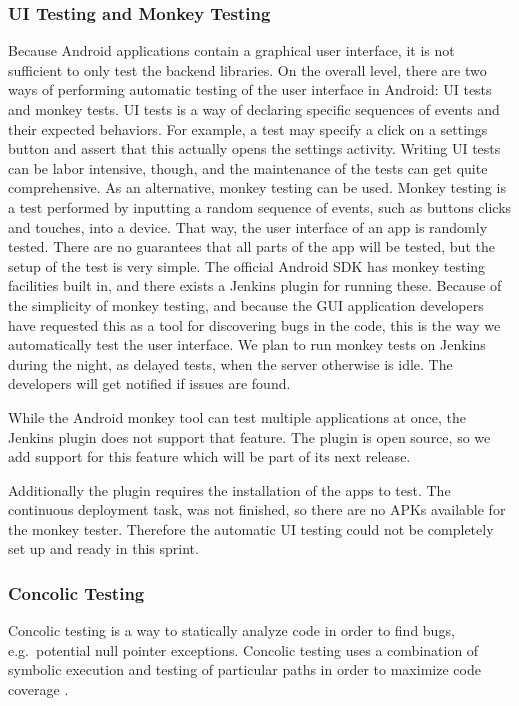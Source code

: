 \subsubsection{UI Testing and Monkey Testing}
Because Android applications contain a graphical user interface, it is not sufficient to only test the backend libraries. On the overall level, there are two ways of performing automatic testing of the user interface in Android: UI tests and monkey tests. UI tests is a way of declaring specific sequences of events and their expected behaviors. For example, a test may specify a click on a settings button and assert that this actually opens the settings activity. Writing UI tests can be labor intensive, though, and the maintenance of the tests can get quite comprehensive. As an alternative, monkey testing can be used. Monkey testing is a test performed by inputting a random sequence of events, such as buttons clicks and touches, into a device. That way, the user interface of an app is randomly tested. There are no guarantees that all parts of the app will be tested, but the setup of the test is very simple. The official Android SDK has monkey testing facilities built in, and there exists a Jenkins plugin for running these. Because of the simplicity of monkey testing, and because the GUI application developers have requested this as a tool for discovering bugs in the code, this is the way we automatically test the user interface. We plan to run monkey tests on Jenkins during the night, as delayed tests, when the server otherwise is idle. The developers will get notified if issues are found.

While the Android monkey tool can test multiple applications at once, the Jenkins plugin does not support that feature. The plugin is open source, so we add support for this feature which will be part of its next release.

Additionally the plugin requires the installation of the apps to test. The continuous deployment task, was not finished, so there are no APKs available for the monkey tester. Therefore the automatic UI testing could not be completely set up and ready in this sprint.

\subsubsection{Concolic Testing}
Concolic testing is a way to statically analyze code in order to find bugs, e.g.\ potential null pointer exceptions. Concolic testing uses a combination of symbolic execution and testing of particular paths in order to maximize code coverage \parencite{concolic_testing_2015}.

